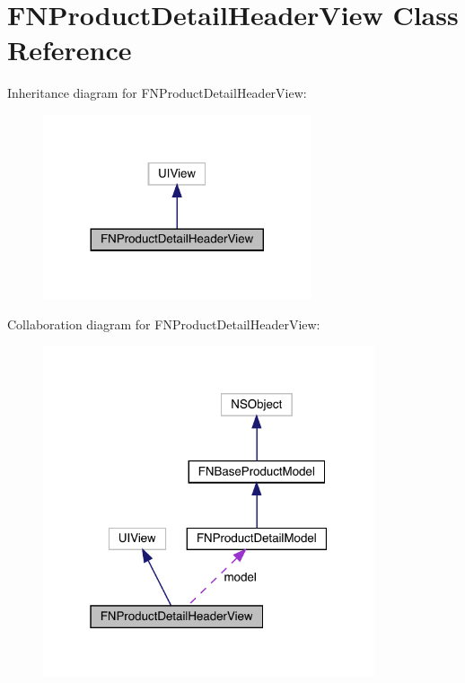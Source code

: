 \hypertarget{interface_f_n_product_detail_header_view}{}\section{F\+N\+Product\+Detail\+Header\+View Class Reference}
\label{interface_f_n_product_detail_header_view}


Inheritance diagram for F\+N\+Product\+Detail\+Header\+View\+:\nopagebreak
\begin{figure}[H]
\begin{center}
\leavevmode
\includegraphics[width=224pt]{interface_f_n_product_detail_header_view__inherit__graph}
\end{center}
\end{figure}


Collaboration diagram for F\+N\+Product\+Detail\+Header\+View\+:\nopagebreak
\begin{figure}[H]
\begin{center}
\leavevmode
\includegraphics[width=277pt]{interface_f_n_product_detail_header_view__coll__graph}
\end{center}
\end{figure}
